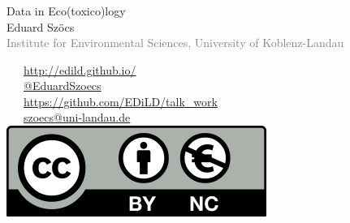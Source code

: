 \documentclass[12pt, t]{beamer}
\begin{document}
\begin{frame}
\frametitle{}
\vspace{1em}
\begin{centering}
\Large \textcolor{title}{Data in Eco(toxico)logy} \\[1em]
Eduard Szöcs \\[0.3em]
\tiny \textcolor{gray}{Institute for Environmental Sciences, University of Koblenz-Landau} \\[5em]
\end{centering}
\normalsize
\textcolor{hilight}{\faLaptop}~~~\href{http://edild.github.io/}{http://edild.github.io/ }\\[.5em]
\textcolor{hilight}{\faTwitter}~~~\href{http://twitter.com/EduardSzoecs}{@EduardSzoecs} 	\\[0.5em]
\textcolor{hilight}{\faGift}~~~\href{https://github.com/edild/talk_work}{https://github.com/EDiLD/talk\_work}\\[0.5em]
\textcolor{hilight}{\faEnvelope}~~~\href{mailto:szoecs@uni-landau.de}{szoecs@uni-landau.de} \\[.5em]
\hfill \includegraphics[width =.3\textwidth]{fig/Cc-by-nc_euro_icon.png} 
\end{frame}
\end{document}
